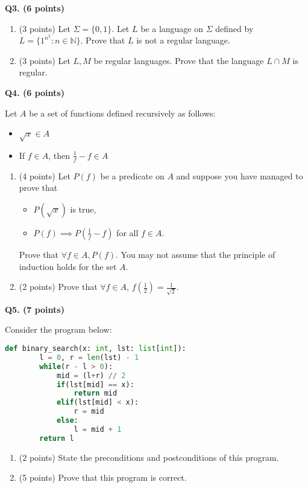 \documentclass{article}
\begin{document}
    \newpage

    \textbf{Q3. (6 points)}

    \begin{enumerate}[label=\alph*)]
        \item (3 points) Let \(\Sigma = \{0, 1\}\). Let \(L\) be a language on \(\Sigma\) defined by \(L = \{1^{n^2} : n \in \mathbb{N}\}\). Prove that \(L\) is not a regular language.
        \vfill
        \item (3 points) Let \(L, M\) be regular languages. Prove that the language \(L \cap M\) is regular.
        \vfill
    \end{enumerate}

    \newpage

    \textbf{Q4. (6 points)}

    Let \(A\) be a set of functions defined recursively as follows:
    \begin{itemize}
        \item \(\sqrt{x} \in A\) 
        \item If \(f \in A\), then \(\frac{1}{f} - f \in A\) 
    \end{itemize}
    
    \begin{enumerate}[label=\alph*)]
        \item (4 points) Let \(P(f)\) be a predicate on \(A\) and suppose you have managed to prove that
        \begin{itemize}
            \item \(P(\sqrt{x})\) is true,
            \item \(P(f) \implies P(\frac{1}{f} - f)\) for all \(f \in A\).
        \end{itemize}
        Prove that \(\forall f \in A, P(f)\). You may not assume that the principle of induction holds for the set \(A\).
        \vfill
        \item (2 points) Prove that \(\forall f \in A\), \(f \left( \frac{1}{2} \right) = \frac{1}{\sqrt{2}}\).
        \vfill
    \end{enumerate}

    \newpage

    \textbf{Q5. (7 points)}

    Consider the program below:
    \begin{lstlisting}[language=Python]
    def binary_search(x: int, lst: list[int]):
        l = 0, r = len(lst) - 1
        while(r - l > 0):
            mid = (l+r) // 2
            if(lst[mid] == x):
                return mid
            elif(lst[mid] < x):
                r = mid
            else:
                l = mid + 1
        return l
    \end{lstlisting}
    \begin{enumerate}[label=\alph*)]
        \item (2 points) State the preconditions and postconditions of this program.
        \pagebreak
        \item (5 points) Prove that this program is correct.
    \end{enumerate}
    \newpage
\end{document}
